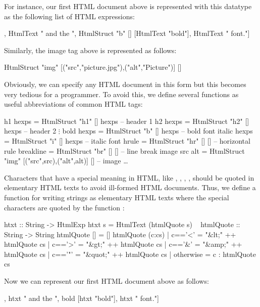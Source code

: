For instance, our first HTML document above is represented with this
datatype as the following list of HTML expressions:
\begin{prog}
[HtmlText "This is the ",
 HtmlStruct "i" [] [HtmlText "italic"],
 HtmlText " and the ",
 HtmlStruct "b" [] [HtmlText "bold"],
 HtmlText " font."]
\end{prog}
Similarly, the image tag above is represented as follows:
\begin{prog}
HtmlStruct "img" [("src","picture.jpg"),("alt","Picture")] []
\end{prog}
%
Obviously, we can specify any HTML document in this form
but this becomes very tedious for a programmer.
To avoid this, we define several functions as useful abbreviations
of common HTML tags:
\begin{prog}
h1     hexps  = HtmlStruct "h1" [] hexps                      -- header 1
h2     hexps  = HtmlStruct "h2" [] hexps                      -- header 2
$\vdots$
bold   hexps  = HtmlStruct "b"  [] hexps                      -- bold font
italic hexps  = HtmlStruct "i"  [] hexps                      -- italic font
hrule         = HtmlStruct "hr" [] []                         -- horizontal rule
breakline     = HtmlStruct "br" [] []                         -- line break
image src alt = HtmlStruct "img" [("src",src),("alt",alt)] [] -- image
\ldots
\end{prog}
%
%
Characters that have a special meaning in HTML,
like \ccode{<}, \ccode{>}, \ccode{\&}, ,
should be quoted in elementary HTML texts
to avoid ill-formed HTML documents. Thus, we define
a function  for writing strings as
elementary HTML texts where the special characters are quoted
by the function :
\begin{prog}
htxt   :: String -> HtmlExp
htxt s = HtmlText (htmlQuote s)
~
htmlQuote :: String -> String
htmlQuote [] = []
htmlQuote (c:cs) | c=='<' = "\&lt;"   ++ htmlQuote cs
                 | c=='>' = "\&gt;"   ++ htmlQuote cs
                 | c=='\&' = "\&amp;"  ++ htmlQuote cs
                 | c=='"' = "\&quot;" ++ htmlQuote cs
                 | otherwise = c : htmlQuote cs
\end{prog}
%
Now we can represent our first HTML document above as follows:
\begin{prog}
[htxt "This is the ", italic [htxt "italic"],
 htxt " and the ", bold [htxt "bold"], htxt " font."]
\end{prog}
